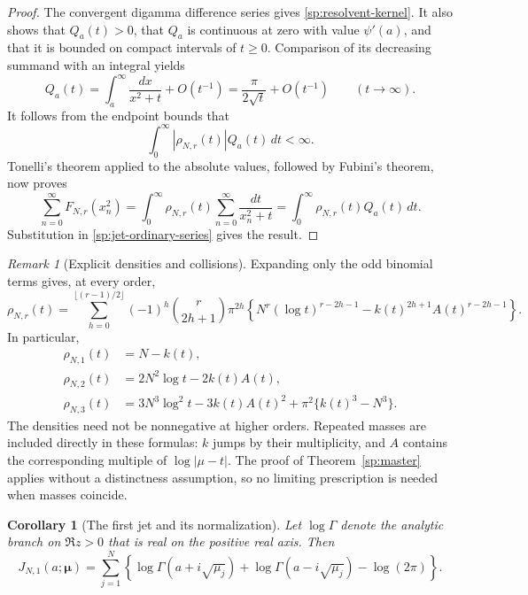 \documentclass[11pt,letterpaper]{article}
\numberwithin{equation}{section}
\newtheorem{corollary}[theorem]{Corollary}
\theoremstyle{definition}
\theoremstyle{remark}
\newtheorem{remark}[theorem]{Remark}
\begin{document}
\begin{proof}
The convergent digamma difference series gives
\eqref{sp:resolvent-kernel}.  It also shows that $Q_a(t)>0$,
that $Q_a$ is continuous at zero with value $\psi'(a)$, and that
it is bounded on compact intervals of $t\geq0$.
Comparison of its decreasing summand with an integral yields
\[
 Q_a(t)=\int_a^{\infty}\frac{dx}{x^2+t}+O(t^{-1})
       =\frac{\pi}{2\sqrt t}+O(t^{-1})
       \qquad(t\to\infty).
\]
It follows from the endpoint bounds that
\[
 \int_0^{\infty}|\rho_{N,r}(t)|Q_a(t)\,dt<\infty.
\]
Tonelli's theorem applied to the absolute values, followed by
Fubini's theorem, now proves
\[
 \sum_{n=0}^{\infty}F_{N,r}(x_n^2)
   =\int_0^{\infty}\rho_{N,r}(t)
                     \sum_{n=0}^{\infty}\frac{dt}{x_n^2+t}
   =\int_0^{\infty}\rho_{N,r}(t)Q_a(t)\,dt.
\]
Substitution in \eqref{sp:jet-ordinary-series} gives the result.
\end{proof}

\begin{remark}[Explicit densities and collisions]
\label{sp:explicit-densities}
Expanding only the odd binomial terms gives, at every order,
\begin{equation}
 \rho_{N,r}(t)=
 \sum_{h=0}^{\lfloor(r-1)/2\rfloor}
   (-1)^h\binom{r}{2h+1}\pi^{2h}
   \left\{N^r(\log t)^{r-2h-1}
                -k(t)^{2h+1}A(t)^{r-2h-1}\right\}.
 \label{sp:binomial-density}
\end{equation}
In particular,
\begin{align}
 \rho_{N,1}(t)&=N-k(t),\label{sp:density-one}\\
 \rho_{N,2}(t)&=2N^2\log t-2k(t)A(t),\label{sp:density-two}\\
 \rho_{N,3}(t)&=3N^3\log^2t-3k(t)A(t)^2
                    +\pi^2\{k(t)^3-N^3\}.
 \label{sp:density-three}
\end{align}
The densities need not be nonnegative at higher orders.
Repeated masses are included directly in these formulas: $k$
jumps by their multiplicity, and $A$ contains the corresponding
multiple of $\log|\mu-t|$.  The proof of
Theorem~\ref{sp:master} applies without a distinctness assumption,
so no limiting prescription is needed when masses coincide.
\end{remark}

\begin{corollary}[The first jet and its normalization]
\label{sp:first-jet}
Let $\log\Gamma$ denote the analytic branch on $\Re z>0$ that
is real on the positive real axis.  Then
\begin{equation}
 J_{N,1}(a;\boldsymbol\mu)
 =\sum_{j=1}^{N}\left\{
       \log\Gamma(a+i\sqrt{\mu_j})
       +\log\Gamma(a-i\sqrt{\mu_j})-\log(2\pi)\right\}.
 \label{sp:first-jet-gamma}
\end{equation}
\end{corollary}
\end{document}
